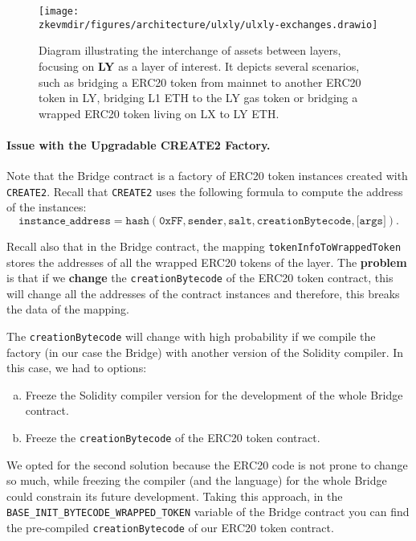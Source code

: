 \begin{figure}[h]
\centering
\texttt{[image: \\zkevmdir/figures/architecture/ulxly/ulxly-exchanges.drawio]}
\caption{Diagram illustrating the interchange of assets between layers, focusing on \textbf{LY} as a layer of interest. It depicts several scenarios, such as bridging a ERC20 token from mainnet to another ERC20 token in LY, bridging L1 ETH to the LY gas token or bridging a wrapped ERC20 token living on LX to LY ETH. }
\label{fig:inter-layer-exchanges}
\end{figure}



\paragraph*{Issue with the Upgradable CREATE2 Factory.}

Note that the Bridge contract is a factory of ERC20 token instances
created with \texttt{CREATE2}. Recall that \texttt{CREATE2} uses the following formula to compute the address of the instances:
\[
\texttt{instance\_address} = \texttt{hash}(\texttt{0xFF}, \texttt{sender}, \texttt{salt}, \texttt{creationBytecode}, \texttt{[args]}).
\]

Recall also that in the Bridge contract, the mapping \texttt{tokenInfoToWrappedToken} stores the addresses of all the wrapped ERC20 tokens of the layer. The \textbf{problem} is that if we \textbf{change} the \texttt{creationBytecode} of the ERC20 token contract, this will change all the addresses of the contract instances and therefore, this breaks the data of the mapping.

The \texttt{creationBytecode} will change with high probability if we compile the factory (in our case the Bridge) with another version of the Solidity compiler. In this case, we had to options:
\begin{enumerate}[a)]
\item Freeze the Solidity compiler version for the development of the whole Bridge contract.
\item Freeze the \texttt{creationBytecode} of the ERC20 token contract.
\end{enumerate}

We opted for the second solution because the ERC20 code is not prone to change so much, while freezing the compiler (and the language) for the whole Bridge could constrain its future development. Taking this approach, in the \texttt{BASE\_INIT\_BYTECODE\_WRAPPED\_TOKEN} variable of the Bridge contract you can find the pre-compiled \texttt{creationBytecode} of our ERC20 token contract.

